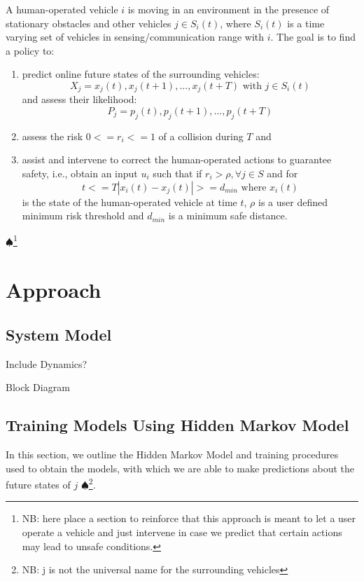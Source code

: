 \documentclass[conference]{IEEEtran}
\newcommand\NB[1]{$\spadesuit$\footnote{NB: #1}}
\begin{document}
    A human-operated vehicle $i$ is moving in an environment in the presence of stationary obstacles and other vehicles $j \in S_i(t)$, where $S_i(t)$ is a time varying set of vehicles in sensing/communication range with $i$. The goal is to find a policy to:
    \begin{enumerate}
        \item  predict online future states of the surrounding vehicles:
    \begin{equation}
    X_j={x_j(t), x_j(t+1),..., x_j(t+T)} \text{ with } j \in S_i(t)
    \end{equation}
    and assess their likelihood:
    \begin{equation}
    P_j={p_j(t), p_j(t+1),..., p_j(t+T)}
    \end{equation}
    \item assess the risk $0<= r_i <=1$ of a collision during $T$ and
    \item assist and intervene to correct the human-operated actions to guarantee safety, i.e., obtain an input $u_i$ such that if $r_i>\rho, \forall j \in S$ and for 
    \begin{equation}
    t<=T |x_i(t)-x_j(t)|>=d_{min} \text{ where } x_i(t)
    \end{equation}
    is the state of the human-operated vehicle at time $t$, $\rho$ is a user defined minimum risk threshold and $d_{min}$ is a minimum safe distance.
    \end{enumerate}
    
    \NB{here place a section to reinforce that this approach is meant to let a user operate a vehicle and just intervene in case we predict that certain actions may lead to unsafe conditions.}

\section{Approach}


\subsection{System Model}
Include Dynamics? 

Block Diagram

\subsection{Training Models Using Hidden Markov Model}
In this section, we outline the Hidden Markov Model and training procedures used to obtain the models, with which we are able to make predictions about the future states of $j$ \NB{j is not the universal name for the surrounding vehicles}.
\end{document}
